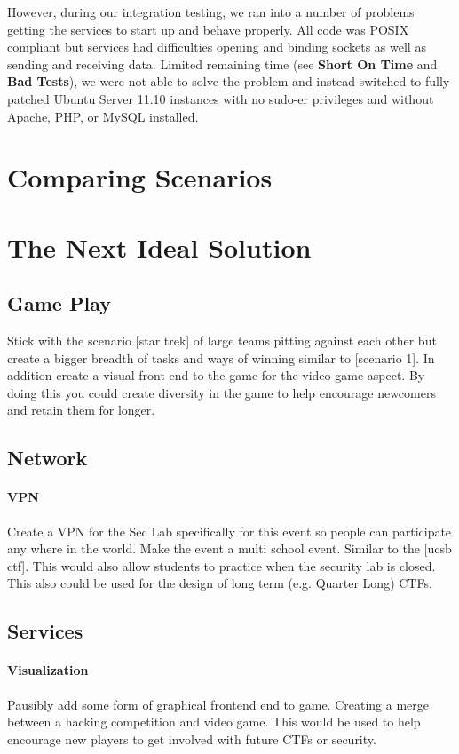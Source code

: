 \documentclass[10pt]{article}
\begin{document}
However, during our integration testing, we ran into a number of problems
getting the services to start up and behave properly. All code was POSIX
compliant but services had difficulties opening and binding sockets as well as
sending and receiving data. Limited remaining time (see \textbf{Short On Time}
and \textbf{Bad Tests}), we were not able to solve the problem and instead
switched to fully patched Ubuntu Server 11.10 instances with no sudo-er
privileges and without Apache, PHP, or MySQL installed. 

\section{Comparing Scenarios}


\section{The Next Ideal Solution}

\subsection{Game Play}
Stick with the scenario [star trek] of large teams pitting against each other 
but create a bigger breadth of tasks and ways of winning similar to [scenario 1].
In addition create a visual front end to the game for the video game aspect.
By doing this you could create diversity in the game to help encourage newcomers
and retain them for longer.

\subsection{Network}

\paragraph{VPN}
Create a VPN for the Sec Lab specifically for this event so people can participate any where
in the world. Make the event a multi school event. Similar to the [ucsb ctf]. This would
also allow students to practice when the security lab is closed. This also could be used
for the design of long term (e.g. Quarter Long) CTFs.

\subsection{Services}

\paragraph{Visualization}
Pausibly add some form of graphical frontend end to game. Creating a merge between
a hacking competition and video game. This would be used to help encourage new players
to get involved with future CTFs or security.
\end{document}
